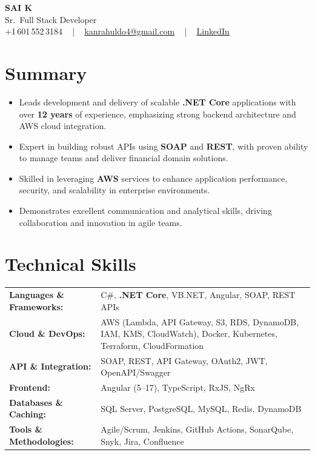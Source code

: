 \documentclass[letterpaper,11pt]{article}
\newcommand{\resumeItem}[1]{
  \item\footnotesize{
    {#1 \vspace{-2pt}}
  }
}
\newcommand{\resumeItemListStart}{\begin{itemize}[leftmargin=*]}
\newcommand{\resumeItemListEnd}{\end{itemize}\vspace{-5pt}}
\begin{document}
\begin{center}
    {\fontsize{14pt}{12pt}\selectfont \textbf{\MakeUppercase{Sai K}}}\\ \vspace{2pt}
    \fontsize{10pt}{12pt}\selectfont Sr.\ Full Stack Developer\\ \vspace{2pt}
    \fontsize{10pt}{12pt}\selectfont +1\,601\,552\,3184 ~ | ~
    \href{mailto:kanrahuldo4@gmail.com}{kanrahuldo4@gmail.com} ~ | ~
    \href{https://www.linkedin.com/in/srrrk/}{\color{blue}\underline{LinkedIn}}
    \vspace{-10pt}
\end{center}

\section{Summary}
\fontsize{9pt}{10pt}\selectfont
\resumeItemListStart
  \resumeItem{Leads development and delivery of scalable \textbf{.NET Core} applications with over \textbf{12 years} of experience, emphasizing strong backend architecture and AWS cloud integration.}
  \resumeItem{Expert in building robust APIs using \textbf{SOAP} and \textbf{REST}, with proven ability to manage teams and deliver financial domain solutions.}
  \resumeItem{Skilled in leveraging \textbf{AWS} services to enhance application performance, security, and scalability in enterprise environments.}
  \resumeItem{Demonstrates excellent communication and analytical skills, driving collaboration and innovation in agile teams.}
\resumeItemListEnd
\vspace{-6pt}

\section{Technical Skills}
\vspace{-14pt}
\begin{table}[h]
\fontsize{9pt}{10pt}\selectfont
\begin{tabular}{p{0.3\linewidth} p{0.7\linewidth}}
\textbf{Languages \& Frameworks:} & C\#, \textbf{.NET Core}, VB.NET, Angular, SOAP, REST APIs \\
\textbf{Cloud \& DevOps:} & AWS (Lambda, API Gateway, S3, RDS, DynamoDB, IAM, KMS, CloudWatch), Docker, Kubernetes, Terraform, CloudFormation \\
\textbf{API \& Integration:} & SOAP, REST, API Gateway, OAuth2, JWT, OpenAPI/Swagger \\
\textbf{Frontend:} & Angular (5--17), TypeScript, RxJS, NgRx \\
\textbf{Databases \& Caching:} & SQL Server, PostgreSQL, MySQL, Redis, DynamoDB \\
\textbf{Tools \& Methodologies:} & Agile/Scrum, Jenkins, GitHub Actions, SonarQube, Snyk, Jira, Confluence \\
\end{tabular}
\end{table}
\vspace{-15pt}
\end{document}

